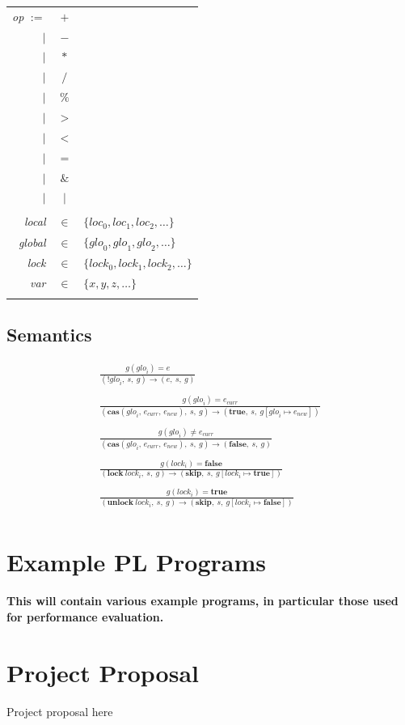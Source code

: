 \documentclass[12pt,a4paper,twoside,openright]{report}
\begin{document}
\begin{tabular}{rcl}
	\textit{op} $:=$ & $+$ &\\
	$\vert$ & $-$ &\\
	$\vert$ & $\ast$ &\\
	$\vert$ & $/$ &\\
	$\vert$ & $\%$ &\\
	$\vert$ & $>$ &\\
	$\vert$ & $<$ &\\
	$\vert$ & $=$ &\\
	$\vert$ & $\&$ &\\
	$\vert$ & $\mid$ &\\
	& &\\
	\textit{local} & $\in$ &
	$\{\textit{loc}_0, \textit{loc}_1, \textit{loc}_2, \ldots\}$ \\
	\textit{global} & $\in$ &
	$\{\textit{glo}_0, \textit{glo}_1, \textit{glo}_2, \ldots\}$ \\
	\textit{lock} & $\in$ &
	$\{\textit{lock}_0, \textit{lock}_1, \textit{lock}_2, \ldots\}$ \\
	\textit{var} & $\in$ & $\{x, y, z, \ldots\}$ \\
	& & \\
\end{tabular}

\section{Semantics}

\begin{gather*}
\frac{g(\textit{glo}_i) = e}
{(!\textit{glo}_i,\ s,\ g) \longrightarrow (e,\ s,\ g)} \\
\\
\frac{g(\textit{glo}_i) = e_\textit{curr}}
{(\textbf{cas}(\textit{glo}_i,\, e_\textit{curr},\, e_\textit{new})
	,\ s,\ g) \longrightarrow (\textbf{true},\ s,
	\ g[\textit{glo}_i \mapsto e_\textit{new}])} \\
\\
\frac{g(\textit{glo}_i) \neq e_\textit{curr}}
{(\textbf{cas}(\textit{glo}_i,\, e_\textit{curr},\, e_\textit{new})
	,\ s,\ g) \longrightarrow
	(\textbf{false},\ s,\ g)} \\
\\
\frac{g(\textit{lock}_i) = \textbf{false}}
{(\textbf{lock}\ \textit{lock}_i,\ s,\ g)
	\longrightarrow (\textbf{skip},\ s,\
	g[\textit{lock}_i \mapsto \textbf{true}])} \\
\\
\frac{g(\textit{lock}_i) = \textbf{true}}
{(\textbf{unlock}\ \textit{lock}_i,\ s,\ g)
	\longrightarrow (\textbf{skip},\ s,\
	g[\textit{lock}_i \mapsto \textbf{false}])} \\
\end{gather*}

\chapter{Example PL Programs}

\textbf{This will contain various
	example programs, in particular
	those used for performance evaluation.}

\chapter{Project Proposal}

Project proposal here
% 
\end{document}

